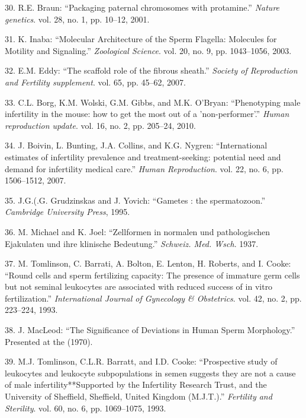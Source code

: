 \documentclass[12pt,a4paper,twoside]{ugathesis}
\theoremstyle{definition}
\theoremstyle{definition}
\theoremstyle{definition}
\theoremstyle{remark}
\begin{document}
\hypertarget{ref-Braun2001}{}
30. R.E. Braun: ``Packaging paternal chromosomes with protamine.''
\emph{Nature genetics}. vol. 28, no. 1, pp. 10--12, 2001.

\hypertarget{ref-Inaba2003}{}
31. K. Inaba: ``Molecular Architecture of the Sperm Flagella: Molecules
for Motility and Signaling.'' \emph{Zoological Science}. vol. 20, no. 9,
pp. 1043--1056, 2003.

\hypertarget{ref-Eddy2007}{}
32. E.M. Eddy: ``The scaffold role of the fibrous sheath.''
\emph{Society of Reproduction and Fertility supplement}. vol. 65, pp.
45--62, 2007.

\hypertarget{ref-Borg2010}{}
33. C.L. Borg, K.M. Wolski, G.M. Gibbs, and M.K. O'Bryan: ``Phenotyping
male infertility in the mouse: how to get the most out of a
'non-performer'.'' \emph{Human reproduction update}. vol. 16, no. 2, pp.
205--24, 2010.

\hypertarget{ref-Boivin2007a}{}
34. J. Boivin, L. Bunting, J.A. Collins, and K.G. Nygren:
``International estimates of infertility prevalence and
treatment-seeking: potential need and demand for infertility medical
care.'' \emph{Human Reproduction}. vol. 22, no. 6, pp. 1506--1512, 2007.

\hypertarget{ref-Grudzinskas1995}{}
35. J.G.(.G. Grudzinskas and J. Yovich: ``Gametes : the spermatozoon.''
\emph{Cambridge University Press}, 1995.

\hypertarget{ref-Michael1937}{}
36. M. Michael and K. Joel: ``Zellformen in normalen und pathologischen
Ejakulaten und ihre klinische Bedeutung.'' \emph{Schweiz. Med. Wsch}.
1937.

\hypertarget{ref-Tomlinson1993a}{}
37. M. Tomlinson, C. Barrati, A. Bolton, E. Lenton, H. Roberts, and I.
Cooke: ``Round cells and sperm fertilizing capacity: The presence of
immature germ cells but not seminal leukocytes are associated with
reduced success of in vitro fertilization.'' \emph{International Journal
of Gynecology \& Obstetrics}. vol. 42, no. 2, pp. 223--224, 1993.

\hypertarget{ref-MacLeod1970}{}
38. J. MacLeod: ``The Significance of Deviations in Human Sperm
Morphology.'' Presented at the (1970).

\hypertarget{ref-Tomlinson1993}{}
39. M.J. Tomlinson, C.L.R. Barratt, and I.D. Cooke: ``Prospective study
of leukocytes and leukocyte subpopulations in semen suggests they are
not a cause of male infertility**Supported by the Infertility Research
Trust, and the University of Sheffield, Sheffield, United Kingdom
(M.J.T.).'' \emph{Fertility and Sterility}. vol. 60, no. 6, pp.
1069--1075, 1993.
\end{document}
